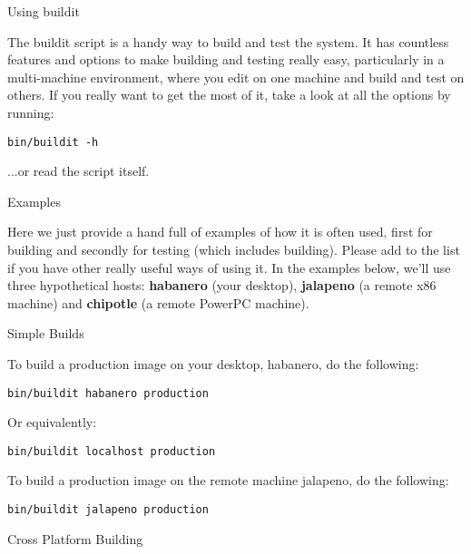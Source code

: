 \begin{section}{Using buildit}
\label{sec:usingbuildit}

The buildit script is a handy way to build and test the system.  It has countless features and options to make building and testing really easy, particularly in a multi-machine environment, where you edit on one machine and build and test on others.  If you really want to get the most of it, take a look at all the options by running:

\begin{lstlisting}
bin/buildit -h
\end{lstlisting}

...or read the script itself.

\begin{subsection}{Examples}

Here we just provide a hand full of examples of how it is often used, first for building and secondly for testing (which includes building). Please add to the list if you have other really useful ways of using it.  In the examples below, we'll use three hypothetical hosts: \textbf{habanero} (your desktop), \textbf{jalapeno} (a remote x86 machine) and \textbf{chipotle} (a remote PowerPC machine).

\begin{subsubsection}{Simple Builds}

To build a production image on your desktop, habanero, do the following: 

\begin{lstlisting}
bin/buildit habanero production
\end{lstlisting}

Or equivalently:

\begin{lstlisting}
bin/buildit localhost production
\end{lstlisting}

To build a production image on the remote machine jalapeno, do the following: 

\begin{lstlisting}
bin/buildit jalapeno production
\end{lstlisting}

\end{subsubsection}

\begin{subsubsection}{Cross Platform Building}


\end{subsubsection}
\end{subsection}
\end{section}
